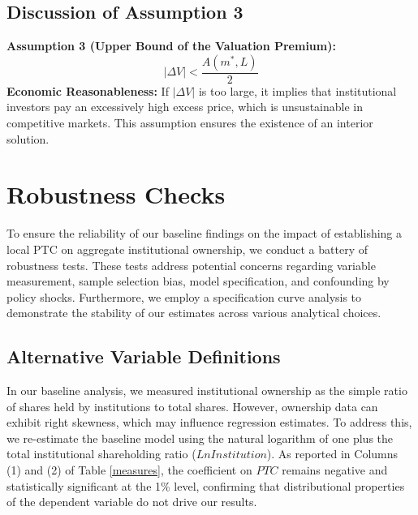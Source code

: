 \documentclass[12pt,a4paper]{article}
\begin{document}
\subsection{Discussion of Assumption 3}
\textbf{Assumption 3 (Upper Bound of the Valuation Premium):}
\begin{equation}
|\Delta V| < \frac{A(m^*, L)}{2}
\end{equation}
\textbf{Economic Reasonableness:}
If $|\Delta V|$ is too large, it implies that institutional investors pay an excessively high excess price, which is unsustainable in competitive markets. This assumption ensures the existence of an interior solution.

\section{Robustness Checks}\label{app:I}
To ensure the reliability of our baseline findings on the impact of establishing a local PTC on aggregate institutional ownership, we conduct a battery of robustness tests. These tests address potential concerns regarding variable measurement, sample selection bias, model specification, and confounding by policy shocks. Furthermore, we employ a specification curve analysis to demonstrate the stability of our estimates across various analytical choices.

\subsection{Alternative Variable Definitions}
In our baseline analysis, we measured institutional ownership as the simple ratio of shares held by institutions to total shares. However, ownership data can exhibit right skewness, which may influence regression estimates. To address this, we re-estimate the baseline model using the natural logarithm of one plus the total institutional shareholding ratio ($LnInstitution$). As reported in Columns (1) and (2) of Table \ref{measures}, the coefficient on $PTC$ remains negative and statistically significant at the 1\% level, confirming that distributional properties of the dependent variable do not drive our results.
\end{document}
